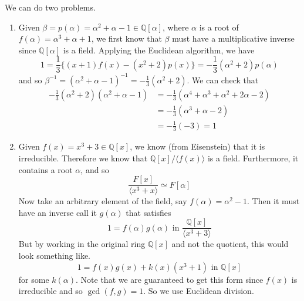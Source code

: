   \begin{example}
    \label{ex:computing-inverses-in-field-extensions}
    We can do two problems. 
    \begin{enumerate}
      \item Given $\beta = p(\alpha) = \alpha^2 + \alpha - 1 \in \mathbb{Q}[\alpha]$, where $\alpha$ is a root of $f(\alpha) = \alpha^3 + \alpha + 1$, we first know that $\beta$ must have a multiplicative inverse since $\mathbb{Q}[\alpha]$ is a field. Applying the Euclidean algorithm, we have 
      \begin{equation}
        1 = \frac{1}{3} \big\{ (x+1) f(x) - (x^2 + 2) p(x)\big\} = -\frac{1}{3} (\alpha^2 + 2) p(\alpha)
      \end{equation}
      and so $\beta^{-1} = (\alpha^2 + \alpha - 1)^{-1} = -\frac{1}{3} (\alpha^2 + 2)$. We can check that 
      \begin{align}
        -\frac{1}{3} (\alpha^2 + 2) (\alpha^2 + \alpha - 1) & = -\frac{1}{3} (\alpha^4 + \alpha^3 + \alpha^2 + 2 \alpha - 2) \\
                                                            & = -\frac{1}{3} (\alpha^3 + \alpha - 2) \\
                                                            & = -\frac{1}{3} (-3) = 1
      \end{align}
      \item Given $f(x) = x^3 + 3 \in \mathbb{Q}[x]$, we know (from Eisenstein) that it is irreducible. Therefore we know that $\mathbb{Q}[x]/\langle f(x) \rangle$ is a field. Furthermore, it contains a root $\alpha$, and so 
      \begin{equation}
        \frac{F[x]}{\langle x^3 + x \rangle} \simeq F[\alpha]
      \end{equation}
      Now take an arbitrary element of the field, say $f(\alpha) = \alpha^2 - 1$. Then it must have an inverse call it $g(\alpha)$ that satisfies 
      \begin{equation}
        1 = f(\alpha) g(\alpha) \text{ in } \frac{\mathbb{Q}[x]}{\langle x^3 + 3 \rangle}
      \end{equation}
      But by working in the original ring $\mathbb{Q}[x]$ and not the quotient, this would look something like. 
      \begin{equation}
        1 = f(x) g(x) + k(x) (x^3 + 1) \text{ in } \mathbb{Q}[x]
      \end{equation} 
      for some $k(\alpha)$. Note that we are guaranteed to get this form since $f(x)$ is irreducible and so $\gcd(f, g) = 1$. So we use Euclidean division. 

\end{enumerate}
\end{example}
